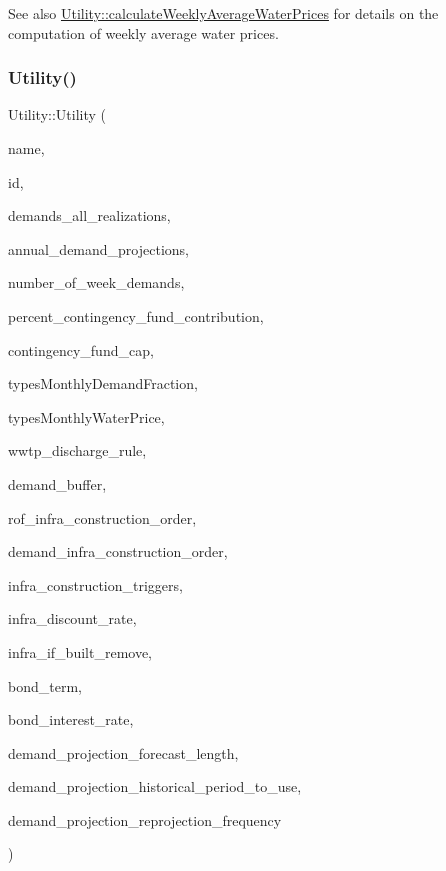 \begin{DoxySeeAlso}{See also}
\mbox{\hyperlink{classUtility_a0189edb631c9596f094b15afeeb934fd}{Utility\+::calculate\+Weekly\+Average\+Water\+Prices}} for details on the computation of weekly average water prices. 
\end{DoxySeeAlso}
\mbox{\label{classUtility_aac7acd5b6fa457869763bbf3b83f870e}} 
\subsubsection{\texorpdfstring{Utility()}{Utility()}\hspace{0.1cm}{\footnotesize\ttfamily [2/4]}}
{\footnotesize\ttfamily Utility\+::\+Utility (\begin{DoxyParamCaption}\item[{const char $\ast$}]{name,  }\item[{int}]{id,  }\item[{vector$<$ vector$<$ double $>$$>$ \&}]{demands\+\_\+all\+\_\+realizations,  }\item[{vector$<$ double $>$ \&}]{annual\+\_\+demand\+\_\+projections,  }\item[{int}]{number\+\_\+of\+\_\+week\+\_\+demands,  }\item[{const double}]{percent\+\_\+contingency\+\_\+fund\+\_\+contribution,  }\item[{const double}]{contingency\+\_\+fund\+\_\+cap,  }\item[{const vector$<$ vector$<$ double $>$$>$ \&}]{types\+Monthly\+Demand\+Fraction,  }\item[{const vector$<$ vector$<$ double $>$$>$ \&}]{types\+Monthly\+Water\+Price,  }\item[{Wwtp\+Discharge\+Rule}]{wwtp\+\_\+discharge\+\_\+rule,  }\item[{double}]{demand\+\_\+buffer,  }\item[{const vector$<$ int $>$ \&}]{rof\+\_\+infra\+\_\+construction\+\_\+order,  }\item[{const vector$<$ int $>$ \&}]{demand\+\_\+infra\+\_\+construction\+\_\+order,  }\item[{const vector$<$ double $>$ \&}]{infra\+\_\+construction\+\_\+triggers,  }\item[{double}]{infra\+\_\+discount\+\_\+rate,  }\item[{const vector$<$ vector$<$ int $>$$>$ \&}]{infra\+\_\+if\+\_\+built\+\_\+remove,  }\item[{double}]{bond\+\_\+term,  }\item[{double}]{bond\+\_\+interest\+\_\+rate,  }\item[{int}]{demand\+\_\+projection\+\_\+forecast\+\_\+length,  }\item[{int}]{demand\+\_\+projection\+\_\+historical\+\_\+period\+\_\+to\+\_\+use,  }\item[{int}]{demand\+\_\+projection\+\_\+reprojection\+\_\+frequency }\end{DoxyParamCaption})}



